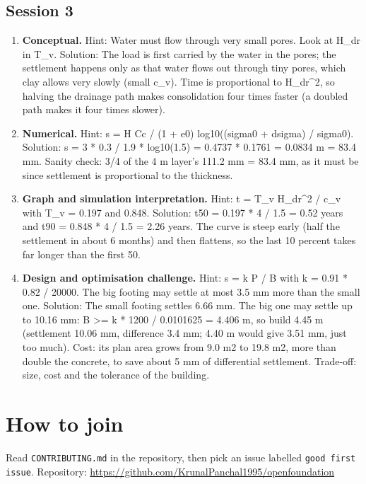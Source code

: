 \documentclass[11pt,a4paper]{article}
\begin{document}
\subsection*{Session 3}
\begin{enumerate}[nosep]
\item \textbf{Conceptual.} Hint: Water must flow through very small pores. Look at H\_dr in T\_v. Solution: The load is first carried by the water in the pores; the settlement happens only as that water flows out through tiny pores, which clay allows very slowly (small c\_v). Time is proportional to H\_dr\textasciicircum{}2, so halving the drainage path makes consolidation four times faster (a doubled path makes it four times slower).
\item \textbf{Numerical.} Hint: s = H Cc / (1 + e0) log10((sigma0 + dsigma) / sigma0). Solution: s = 3 * 0.3 / 1.9 * log10(1.5) = 0.4737 * 0.1761 = 0.0834 m = 83.4 mm. Sanity check: 3/4 of the 4 m layer's 111.2 mm = 83.4 mm, as it must be since settlement is proportional to the thickness.
\item \textbf{Graph and simulation interpretation.} Hint: t = T\_v H\_dr\textasciicircum{}2 / c\_v with T\_v = 0.197 and 0.848. Solution: t50 = 0.197 * 4 / 1.5 = 0.52 years and t90 = 0.848 * 4 / 1.5 = 2.26 years. The curve is steep early (half the settlement in about 6 months) and then flattens, so the last 10 percent takes far longer than the first 50.
\item \textbf{Design and optimisation challenge.} Hint: s = k P / B with k = 0.91 * 0.82 / 20000. The big footing may settle at most 3.5 mm more than the small one. Solution: The small footing settles 6.66 mm. The big one may settle up to 10.16 mm: B \textgreater{}= k * 1200 / 0.0101625 = 4.406 m, so build 4.45 m (settlement 10.06 mm, difference 3.4 mm; 4.40 m would give 3.51 mm, just too much). Cost: its plan area grows from 9.0 m2 to 19.8 m2, more than double the concrete, to save about 5 mm of differential settlement. Trade-off: size, cost and the tolerance of the building.
\end{enumerate}

\section{How to join}
Read \texttt{CONTRIBUTING.md} in the repository, then pick an issue labelled \texttt{good first issue}. Repository: \url{https://github.com/KrunalPanchal1995/openfoundation}
\end{document}
